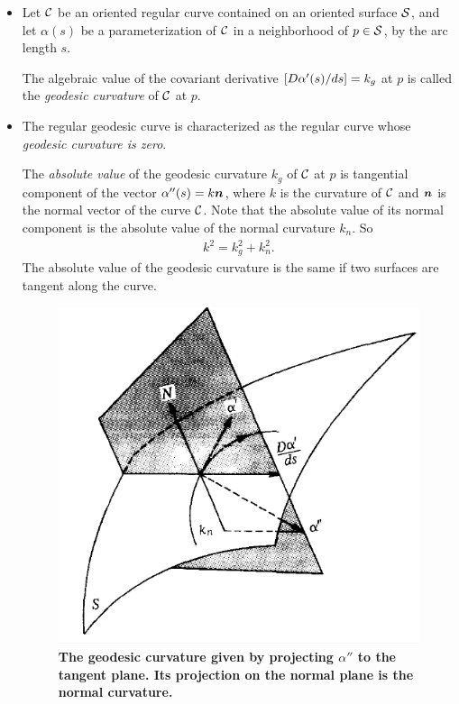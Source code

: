 \documentclass[11pt]{article}
\begin{document}
\begin{itemize}
\item Let ${\mathcal C}$ be an oriented regular curve contained on an oriented surface ${\mathcal S}$, and let $\alpha(s)$ be a parameterization of ${\mathcal C}$ in a neighborhood of $p\in {\mathcal S}$, by the arc length $s$. 
\begin{definition}
The algebraic value of the covariant derivative $\left[D\alpha'(s)/ds\right] = k_{g}$ at $p$ is called the \emph{geodesic curvature} of ${\mathcal C}$ at $p$. 
\end{definition}

\item  \begin{remark}
The regular geodesic curve is characterized as the regular curve whose \emph{geodesic curvature is zero}.  

The \emph{absolute value} of the geodesic curvature $k_{g}$ of ${\mathcal C}$ at $p$ is tangential component of the vector $\alpha''(s)= k\boldsymbol{n}$, where $k$ is the curvature of ${\mathcal C}$ and $\boldsymbol{n}$ is the normal vector of the curve ${\mathcal C}$. Note that the absolute value of its normal component is the absolute value of the normal curvature $k_{n}$. So
\begin{align*}
k^{2} = k_{g}^{2} + k_{n}^{2}.
\end{align*} The absolute value of the geodesic curvature is the same if two surfaces are tangent along the curve. 
\begin{figure}[tbh]
\centering
\begin{minipage}{0.6\linewidth}
 \centerline{\includegraphics[scale = 0.43]{geo_curv.png}}
\end{minipage}
\caption{\scriptsize
\textbf{The geodesic curvature given by projecting $\alpha''$ to the tangent plane. Its projection on the normal plane is the normal curvature.   }}
\end{figure}
\end{remark}


\end{itemize}
\end{document}
